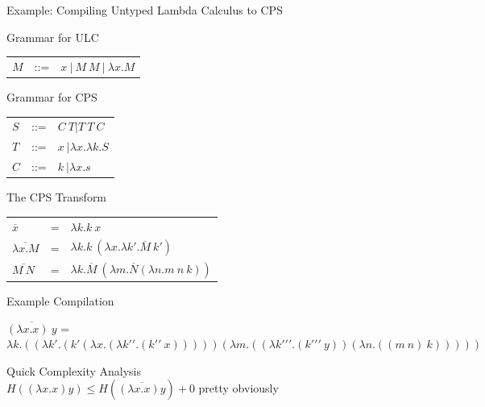 \documentclass{beamer}
\begin{document}
\begin{frame}{Example: Compiling Untyped Lambda Calculus to CPS}

\begin{structure}{Grammar for ULC}
\begin{tabular}[t]{lll}
$M$ &::=& $x\ \vert\ M\ M\ \vert\ \lambda x . M$\\
\end{tabular}
\end{structure}

\begin{structure}{Grammar for CPS}
\begin{tabular}[t]{lll}
$S$ &::=& $C\ T \vert T\ T\ C$\\
$T$ &::=& $x\ \vert \lambda x . \lambda k . S$\\
$C$ &::=& $k\ \vert \lambda x . s$\\
\end{tabular}
\end{structure}


\begin{structure}{The CPS Transform}
\\
\begin{tabular}[t]{lll}
$\overline{x}$ &=& $\lambda k . k\ x$\\

$\overline{\lambda x . M}$ &=& $\lambda k .
 k\ (\lambda x . \lambda k\prime . \overline{M}\ k\prime)$\\

$\overline{M\ N}$ &=& $\lambda k. \overline{M}\
 (\lambda m . \overline{N} (\lambda n . m\ n\ k))$\\

\end{tabular}

\end{structure}

\medskip
\begin{structure}{Example Compilation}

$\overline{(\lambda x . x)\ y}$ =\\
$\lambda k . ((\lambda k\prime. (k\prime (\lambda x . (\lambda k\prime\prime .
 (k\prime\prime\ x))))) (\lambda m . ((\lambda k\prime\prime\prime .
 (k\prime\prime\prime\ y)) (\lambda n .
 ((m\ n)\ k)))))$
\end{structure}

\begin{structure}{Quick Complexity Analysis}
\\
$H((\lambda x. x) y) \le H(\overline{(\lambda x . x) y}) + 0$ pretty obviously

\end{structure}

\end{frame}
\end{document}
